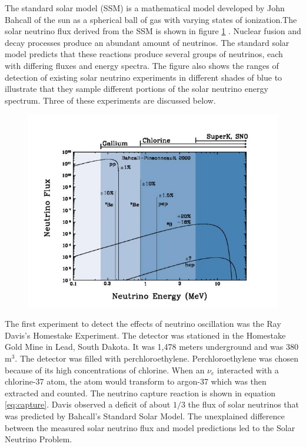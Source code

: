 The standard solar model (SSM) is a mathematical model developed by John Bahcall of the sun as a spherical ball of gas with varying states of ionization.The solar neutrino flux derived from the SSM is shown in figure \ref{fig:solarmodel} \cite{bahcall}. Nuclear fusion and decay processes produce an abundant amount of neutrinos. The standard solar model predicts that these reactions produce several groups of neutrinos, each with differing fluxes and energy spectra. The figure also shows the ranges of detection of existing solar neutrino experiments in different shades of blue to illustrate that they sample different portions of the solar neutrino energy spectrum. Three of these experiments are discussed below.

\begin{figure}[htp]
\centering
\includegraphics[scale=.55]{figs/solarmodel.jpg}
\label{fig:solarmodel}
\end{figure}

The first experiment to detect the effects of neutrino oscillation was the Ray Davis's Homestake Experiment. The detector was stationed in the Homestake Gold Mine in Lead, South Dakota. It was 1,478 meters underground and was 380 $\text{m}^3$. The detector was filled with perchloroethylene. Perchloroethylene was chosen because of its high concentrations of chlorine. When an $\nu_{e}$ interacted with a chlorine-37 atom, the atom would transform to argon-37 which was then extracted and counted. The neutrino capture reaction is shown in equation \ref{eq:capture}. Davis observed a deficit of about $1/3$ the flux of solar neutrinos that was predicted by Bahcall's Standard Solar Model. The unexplained difference between the measured solar neutrino flux and model predictions led to the Solar Neutrino Problem.\cite{fnal}

